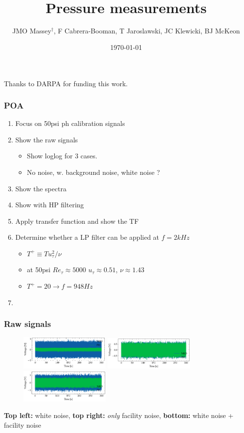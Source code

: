 \documentclass[aspectratio=169,9pt]{beamer}
\title{Pressure measurements}
\author{JMO Massey$^{\dag}$, F Cabrera-Booman, T Jaroslawski, JC Klewicki, BJ McKeon}
\institute{Center for Turbulence Research \\ Stanford University}
\date{\today}
\begin{document}
\begin{frame}
    \setcounter{framenumber}{0}
    \titlepage
    \vfill
    {\scriptsize \centering Thanks to DARPA for funding this work.\par}
\end{frame}

\begin{frame}
  \frametitle{POA}
  \begin{enumerate}
    \item Focus on 50psi ph calibration signals
    \item Show the raw signals
    \begin{itemize}
        \item Show loglog for 3 cases.
        \item No noise, w. background noise, white noise ?
    \end{itemize}
    \item Show the spectra
    \item Show with HP filtering
    \item Apply transfer function and show the TF
    \item Determine whether a LP filter can be applied at $f=2kHz$
    \begin{itemize}
        \item $T^+\equiv T u_\tau^2/\nu$
        \item at 50psi $Re_\tau\approx 5000$ $u_\tau\approx 0.51$, $\nu\approx 1.43$
        \item $T^+=20 \to f=948Hz$
    \end{itemize}
    \item 
  \end{enumerate}
\end{frame}

\begin{frame}
  \frametitle{Raw signals}
  \begin{figure}
    \centering
    \includegraphics[width=0.4\textwidth]{sanity/50psi/PH-NKD/calib_ts_signals_50psi_nonoise.pdf}
    \includegraphics[width=0.4\textwidth]{sanity/50psi/PH-NKD/calib_ts_signals_50psi_noise.pdf}
    \includegraphics[width=0.4\textwidth]{sanity/50psi/PH-NKD/calib_ts_signals_50psi_noiseWN.pdf}
  \end{figure}
  \textbf{Top left:} white noise, \textbf{top right:} \emph{only} facility noise, \textbf{bottom:} white noise + facility noise
\end{frame}
\end{document}
